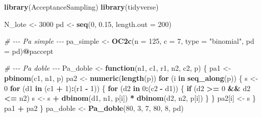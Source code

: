 \documentclass[
  12pt,
]{article}
\newenvironment{Shaded}{\begin{snugshade}}{\end{snugshade}}
\newcommand{\AttributeTok}[1]{\textcolor[rgb]{0.13,0.29,0.53}{#1}}
\newcommand{\CommentTok}[1]{\textcolor[rgb]{0.56,0.35,0.01}{\textit{#1}}}
\newcommand{\ControlFlowTok}[1]{\textcolor[rgb]{0.13,0.29,0.53}{\textbf{#1}}}
\newcommand{\DecValTok}[1]{\textcolor[rgb]{0.00,0.00,0.81}{#1}}
\newcommand{\FloatTok}[1]{\textcolor[rgb]{0.00,0.00,0.81}{#1}}
\newcommand{\FunctionTok}[1]{\textcolor[rgb]{0.13,0.29,0.53}{\textbf{#1}}}
\newcommand{\NormalTok}[1]{#1}
\newcommand{\OtherTok}[1]{\textcolor[rgb]{0.56,0.35,0.01}{#1}}
\newcommand{\SpecialCharTok}[1]{\textcolor[rgb]{0.81,0.36,0.00}{\textbf{#1}}}
\newcommand{\StringTok}[1]{\textcolor[rgb]{0.31,0.60,0.02}{#1}}
\begin{document}
\begin{Shaded}
\begin{Highlighting}[]
\FunctionTok{library}\NormalTok{(AcceptanceSampling)}
\FunctionTok{library}\NormalTok{(tidyverse)}

\NormalTok{N\_lote }\OtherTok{\textless{}{-}} \DecValTok{3000}
\NormalTok{pd     }\OtherTok{\textless{}{-}} \FunctionTok{seq}\NormalTok{(}\DecValTok{0}\NormalTok{, }\FloatTok{0.15}\NormalTok{, }\AttributeTok{length.out =} \DecValTok{200}\NormalTok{)}

\CommentTok{\# {-}{-}{-} Pa simple {-}{-}{-}}
\NormalTok{pa\_simple }\OtherTok{\textless{}{-}} \FunctionTok{OC2c}\NormalTok{(}\AttributeTok{n =} \DecValTok{125}\NormalTok{, }\AttributeTok{c =} \DecValTok{7}\NormalTok{, }\AttributeTok{type =} \StringTok{"binomial"}\NormalTok{, }\AttributeTok{pd =}\NormalTok{ pd)}\SpecialCharTok{@}\NormalTok{paccept}

\CommentTok{\# {-}{-}{-} Pa doble {-}{-}{-}}
\NormalTok{Pa\_doble }\OtherTok{\textless{}{-}} \ControlFlowTok{function}\NormalTok{(n1, c1, r1, n2, c2, p) \{}
\NormalTok{  pa1 }\OtherTok{\textless{}{-}} \FunctionTok{pbinom}\NormalTok{(c1, n1, p)}
\NormalTok{  pa2 }\OtherTok{\textless{}{-}} \FunctionTok{numeric}\NormalTok{(}\FunctionTok{length}\NormalTok{(p))}
  \ControlFlowTok{for}\NormalTok{ (i }\ControlFlowTok{in} \FunctionTok{seq\_along}\NormalTok{(p)) \{}
\NormalTok{    s }\OtherTok{\textless{}{-}} \DecValTok{0}
    \ControlFlowTok{for}\NormalTok{ (d1 }\ControlFlowTok{in}\NormalTok{ (c1 }\SpecialCharTok{+} \DecValTok{1}\NormalTok{)}\SpecialCharTok{:}\NormalTok{(r1 }\SpecialCharTok{{-}} \DecValTok{1}\NormalTok{)) \{}
      \ControlFlowTok{for}\NormalTok{ (d2 }\ControlFlowTok{in} \DecValTok{0}\SpecialCharTok{:}\NormalTok{(c2 }\SpecialCharTok{{-}}\NormalTok{ d1)) \{}
        \ControlFlowTok{if}\NormalTok{ (d2 }\SpecialCharTok{\textgreater{}=} \DecValTok{0} \SpecialCharTok{\&\&}\NormalTok{ d2 }\SpecialCharTok{\textless{}=}\NormalTok{ n2)}
\NormalTok{          s }\OtherTok{\textless{}{-}}\NormalTok{ s }\SpecialCharTok{+} \FunctionTok{dbinom}\NormalTok{(d1, n1, p[i]) }\SpecialCharTok{*} \FunctionTok{dbinom}\NormalTok{(d2, n2, p[i])}
\NormalTok{      \}}
\NormalTok{    \}}
\NormalTok{    pa2[i] }\OtherTok{\textless{}{-}}\NormalTok{ s}
\NormalTok{  \}}
\NormalTok{  pa1 }\SpecialCharTok{+}\NormalTok{ pa2}
\NormalTok{\}}
\NormalTok{pa\_doble }\OtherTok{\textless{}{-}} \FunctionTok{Pa\_doble}\NormalTok{(}\DecValTok{80}\NormalTok{, }\DecValTok{3}\NormalTok{, }\DecValTok{7}\NormalTok{, }\DecValTok{80}\NormalTok{, }\DecValTok{8}\NormalTok{, pd)}


\end{Highlighting}
\end{Shaded}
\end{document}
